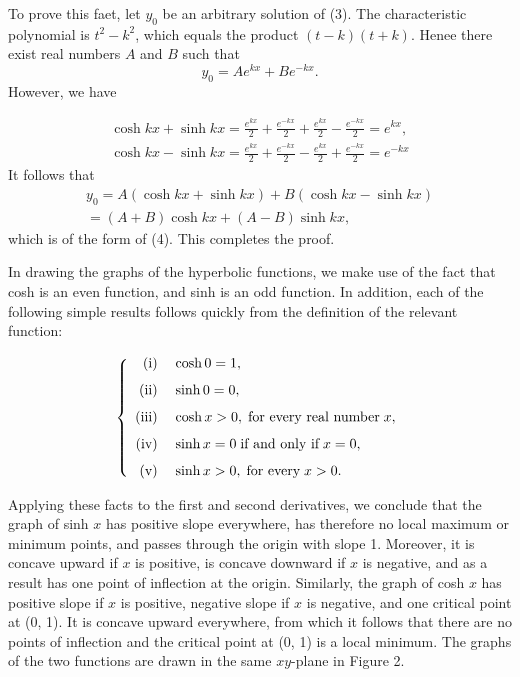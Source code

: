 To prove this faet, let $y_0$ be an arbitrary solution of (3). The characteristic polynomial is $t^2 - k^2$, which equals the product $(t - k)(t + k)$. Henee there exist real numbers $A$ and $B$ such that
$$
y_0 = Ae^{kx} + Be^{-kx} .
$$
However, we have

\begin{eqnarray*}
\cosh kx + \sinh kx = \frac{e^{kx}}{2} + \frac{e^{-kx}}{2} + \frac{e^{kx}}{2} - \frac{e^{-kx}}{2} = e^{kx}, \\
\cosh kx - \sinh kx = \frac{e^{kx}}{2} + \frac{e^{-kx}}{2} - \frac{e^{kx}}{2} + \frac{e^{-kx}}{2} = e^{-kx}
\end{eqnarray*}
It follows that 
\begin{eqnarray*}
y_0 = A(\cosh kx + \sinh kx) + B(\cosh kx - \sinh kx) \\
       = (A + B) \cosh kx + (A - B) \sinh kx,
\end{eqnarray*}
which is of the form of (4). This completes the proof.

In drawing the graphs of the hyperbolic functions, we make use of the fact that cosh is an even function, and sinh is an odd function. In addition, each of the following simple results follows quickly from the definition of the relevant function:

\begin{theorem}
$$
\left \{ \begin{array}{rl}
\mathrm{(i)}\; & \cosh 0 = 1, \vspace{.1in}\\
\mathrm{(ii)}\;& \sinh0 = 0, \vspace{.1in}\\
\mathrm{(iii)}\;& \cosh x > 0, \;\mbox{for every real number}\; x, \vspace{.1in}\\
\mathrm{(iv)}\;& \sinh x = 0 \;\mbox{if and only if}\; x = 0, \vspace{.1in}\\
\mathrm{(v)}\; & \sinh x > 0, \;\mbox{for every}\; x > 0.
\end{array}
\right .
$$
\end{theorem}
Applying these facts to the first and second derivatives, we conclude that the graph of sinh $x$ has positive slope everywhere, has therefore no local maximum or minimum points, and passes through the origin with slope 1. Moreover, it is concave upward if $x$ is positive, is concave downward if $x$ is negative, and as a result has one point of inflection at the origin. Similarly, the graph of cosh $x$ has positive slope if $x$ is positive, negative slope if $x$ is negative, and one critical point at (0, 1). It is concave upward everywhere, from which it follows that there are no points of inflection and the critical point at (0, 1) is a local minimum. The graphs of the two functions are drawn in the same $xy$-plane in Figure 2.

